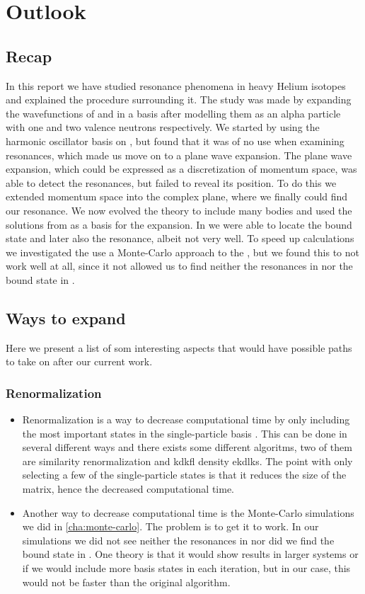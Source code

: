 \documentclass[../main/report.tex]{subfiles}
\begin{document}
\chapter{Outlook}
\label{cha:outlook}

\section{Recap}
In this report we have studied resonance phenomena in heavy Helium isotopes and explained the procedure surrounding it.
The study was made by expanding the wavefunctions of  and  in a basis after modelling them as an alpha particle with one and two valence neutrons respectively.
We started by using the harmonic oscillator basis on , but found that it was of no use when examining resonances, which made us move on to a plane wave expansion.
The plane wave expansion, which could be expressed as a discretization of momentum space, was able to detect the resonances, but failed to reveal its position.
To do this we extended momentum space into the complex plane, where we finally could find our resonance.
We now evolved the theory to include many bodies and used the solutions from  as a basis for the  expansion.
In  we were able to locate the bound state and later also the resonance, albeit not very well.
To speed up calculations we investigated the use a Monte-Carlo approach to the , but we found this to not work well at all, since it not allowed us to find neither the resonances in  nor the bound state in .


\section{Ways to expand}
Here we present a list of som interesting aspects that would have possible paths to take on after our current work.
\subsection{Renormalization}
  \begin{itemize}
    \item Renormalization is a way to decrease computational time by only including the most important states in the single-particle basis \cite{jimmy}.
    This can be done in several different ways and there exists some different algoritms, two of them are similarity renormalization and kdkfl density ekdlks.
    The point with only selecting a few of the single-particle states is that it reduces the size of the matrix, hence the decreased computational time.
    \item Another way to decrease computational time is the Monte-Carlo simulations we did in \cref{cha:monte-carlo}.
    The problem is to get it to work.
    In our simulations we did not see neither the resonances in  nor did we find the bound state in .
    One theory is that it would show results in larger systems or if we would include more basis states in each iteration, but in our case, this would not be faster than the original algorithm.
  \end{itemize}
\end{document}
